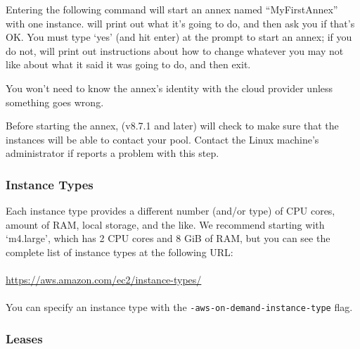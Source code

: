 Entering the following command will start an annex named ``MyFirstAnnex'' with
one instance.   will print out what it's going to do, and then
ask you if that's OK.  You must type `yes' (and hit enter) at the prompt to
start an annex; if you do not,  will print out instructions
about how to change whatever you may not like about what it said it was going
to do, and then exit.


You won't need to know the annex's identity with the cloud provider unless
something goes wrong.

Before starting the annex,  (v8.7.1 and later) will check to make sure that the
instances will be able to contact your pool.  Contact the Linux machine's
administrator if  reports a problem with this step.

\subsubsection{Instance Types}

Each instance type provides a different number (and/or type) of CPU cores,
amount of RAM, local storage, and the like.  We recommend starting with
`m4.large', which has 2 CPU cores and 8 GiB of RAM, but you can see the
complete list of instance types at the following URL:\\
\\
\url{https://aws.amazon.com/ec2/instance-types/}\\
\\
You can specify an instance type with
the \texttt{-aws-on-demand-instance-type} flag.

\subsubsection{Leases}

